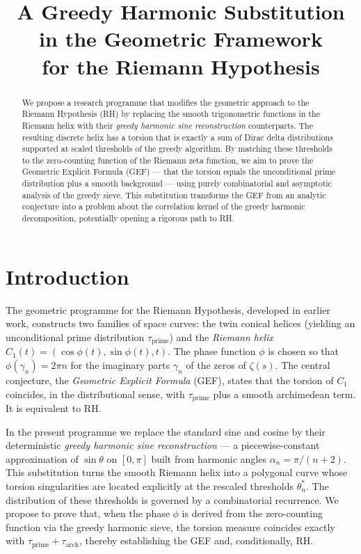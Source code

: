 \documentclass[12pt,a4paper]{article}
\title{\bf A Greedy Harmonic Substitution in the Geometric Framework\\ for the Riemann Hypothesis}
\author{}
\date{}
\begin{document}
\maketitle

\begin{abstract}
We propose a research programme that modifies the geometric approach to the Riemann Hypothesis (RH) by replacing the smooth trigonometric functions in the Riemann helix with their \emph{greedy harmonic sine reconstruction} counterparts.  The resulting discrete helix has a torsion that is exactly a sum of Dirac delta distributions supported at scaled thresholds of the greedy algorithm.  By matching these thresholds to the zero-counting function of the Riemann zeta function, we aim to prove the Geometric Explicit Formula (GEF) — that the torsion equals the unconditional prime distribution plus a smooth background — using purely combinatorial and asymptotic analysis of the greedy sieve.  This substitution transforms the GEF from an analytic conjecture into a problem about the correlation kernel of the greedy harmonic decomposition, potentially opening a rigorous path to RH.
\end{abstract}

\section{Introduction}

The geometric programme for the Riemann Hypothesis, developed in earlier work, constructs two families of space curves: the twin conical helices (yielding an unconditional prime distribution \(\tau_{\mathrm{prime}}\)) and the \emph{Riemann helix} \(C_1(t)=(\cos\phi(t),\sin\phi(t),t)\).  The phase function \(\phi\) is chosen so that \(\phi(\gamma_n)=2\pi n\) for the imaginary parts \(\gamma_n\) of the zeros of \(\zeta(s)\).  The central conjecture, the \emph{Geometric Explicit Formula} (GEF), states that the torsion of \(C_1\) coincides, in the distributional sense, with \(\tau_{\mathrm{prime}}\) plus a smooth archimedean term.  It is equivalent to RH.

In the present programme we replace the standard sine and cosine by their deterministic \emph{greedy harmonic sine reconstruction} — a piecewise-constant approximation of \(\sin\theta\) on \([0,\pi]\) built from harmonic angles \(\alpha_n=\pi/(n+2)\).  This substitution turns the smooth Riemann helix into a polygonal curve whose torsion singularities are located explicitly at the rescaled thresholds \(\theta_n^*\).  The distribution of these thresholds is governed by a combinatorial recurrence.  We propose to prove that, when the phase \(\phi\) is derived from the zero-counting function via the greedy harmonic sieve, the torsion measure coincides exactly with \(\tau_{\mathrm{prime}} + \tau_{\mathrm{arch}}\), thereby establishing the GEF and, conditionally, RH.
\end{document}
